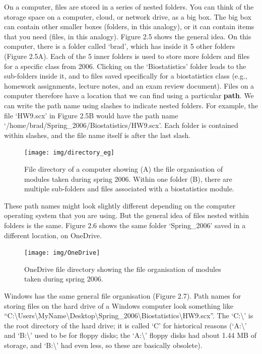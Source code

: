 \documentclass[
]{scrbook}
\begin{document}
On a computer, files are stored in a series of nested folders.
You can think of the storage space on a computer, cloud, or network drive, as a big box.
The big box can contain other smaller boxes (folders, in this analogy), or it can contain items that you need (files, in this analogy).
Figure 2.5 shows the general idea.
On this computer, there is a folder called `brad', which has inside it 5 other folders (Figure 2.5A).
Each of the 5 inner folders is used to store more folders and files for a specific class from 2006.
Clicking on the `Biostatistics' folder leads to the sub-folders inside it, and to files saved specifically for a biostatistics class (e.g., homework assignments, lecture notes, and an exam review document).
Files on a computer therefore have a location that we can find using a particular \textbf{path}.
We can write the path name using slashes to indicate nested folders.
For example, the file `HW9.scx' in Figure 2.5B would have the path name `/home/brad/Spring\_2006/Biostatistics/HW9.scx'.
Each folder is contained within slashes, and the file name itself is after the last slash.

\begin{figure}
\texttt{[image: img/directory\_eg]} \caption{File directory of a computer showing (A) the file organisation of modules taken during spring 2006. Within one folder (B), there are multiple sub-folders and files associated with a biostatistics module.}\label{fig:unnamed-chunk-8}
\end{figure}

These path names might look slightly different depending on the computer operating system that you are using.
But the general idea of files nested within folders is the same.
Figure 2.6 shows the same folder `Spring\_2006' saved in a different location, on OneDrive.

\begin{figure}
\texttt{[image: img/OneDrive]} \caption{OneDrive file directory showing the file organisation of modules taken during spring 2006.}\label{fig:unnamed-chunk-9}
\end{figure}

Windows has the same general file organisation (Figure 2.7).
Path names for storing files on the hard drive of a Windows computer look something like ``C:\textbackslash Users\textbackslash MyName\textbackslash Desktop\textbackslash Spring\_2006\textbackslash Biostatistics\textbackslash HW9.scx''.
The `C:\textbackslash{}' is the root directory of the hard drive; it is called `C' for historical reasons (`A:\textbackslash{}' and `B:\textbackslash{}' used to be for floppy disks; the `A:\textbackslash{}' floppy disks had about 1.44 MB of storage, and `B:\textbackslash{}' had even less, so these are basically obsolete).
\end{document}
